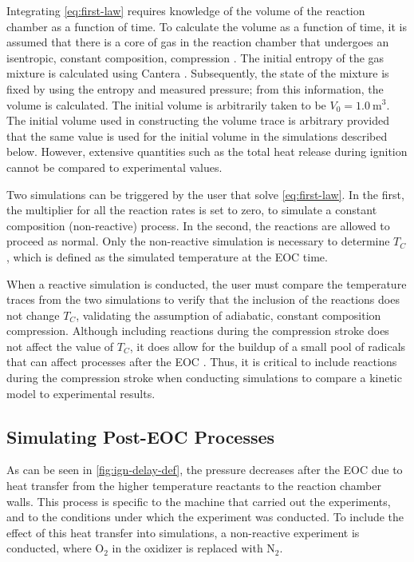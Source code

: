\documentclass[12pt]{../ussci}
\begin{document}
Integrating \cref{eq:first-law} requires knowledge of the
volume of the reaction chamber as a function of time. To calculate the
volume as a function of time, it is assumed that there is a core of gas
in the reaction chamber that undergoes an isentropic, constant composition,
compression \autocite{Lee1998}. The initial entropy of the gas mixture is
calculated using Cantera \autocite{cantera}. Subsequently, the state of the
mixture is fixed by using the entropy and measured pressure; from this
information, the volume is calculated. The initial volume is
arbitrarily taken to be \(V_0=\SI{1.0}{\m\cubed}\). The initial volume used
in constructing the volume trace is arbitrary provided that the same
value is used for the initial volume in the simulations described below.
However, extensive quantities such as the total heat release during
ignition cannot be compared to experimental values.

Two simulations can be triggered by the user that solve \cref{eq:first-law}.
In the first, the multiplier for all the reaction rates is
set to zero, to simulate a constant composition (non-reactive) process.
In the second, the reactions are allowed to proceed as normal. Only the
non-reactive simulation is necessary to determine \(T_C\), which is
defined as the simulated temperature at the EOC time.

When a reactive simulation is conducted, the user must compare the
temperature traces from the two simulations to verify that the inclusion
of the reactions does not change \(T_C\), validating the assumption of
adiabatic, constant composition compression. Although including
reactions during the compression stroke does not affect the value of
\(T_C\), it does allow for the buildup of a small pool of radicals that
can affect processes after the EOC \autocite{Mittal2008}. Thus, it is
critical to include reactions during the compression stroke when
conducting simulations to compare a kinetic model to experimental
results.

\subsection{Simulating Post-EOC Processes}\label{simulating-post-eoc-processes}

As can be seen in \cref{fig:ign-delay-def}, the pressure
decreases after the EOC due to heat transfer from the higher temperature
reactants to the reaction chamber walls. This process is specific to the
machine that carried out the experiments, and to the conditions under
which the experiment was conducted. To include the effect of this heat
transfer into simulations, a non-reactive experiment is conducted, where
\(\text{O}_2\) in the oxidizer is replaced with \(\text{N}_2\).
\end{document}
